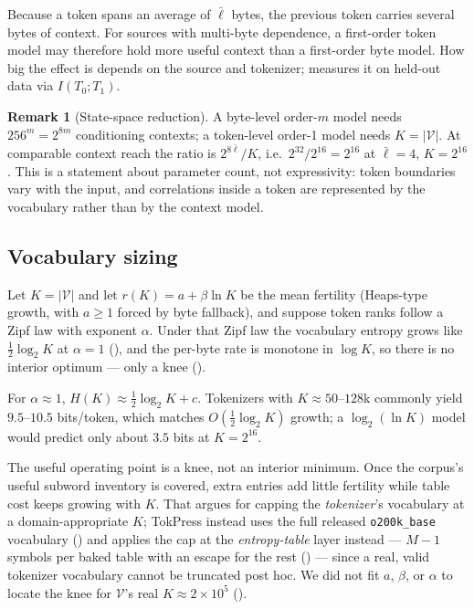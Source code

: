 \documentclass[10pt,twocolumn]{article}
\theoremstyle{plain}
\theoremstyle{definition}
\newtheorem{remark}[theorem]{Remark}
\newcommand{\V}{\mathcal{V}}
\begin{document}
Because a token spans an average of $\bar\ell$ bytes, the previous token carries
several bytes of context. For sources with multi-byte dependence, a first-order token
model may therefore hold more useful context than a first-order byte model. How big
the effect is depends on the source and tokenizer;  measures it on
held-out data via $I(T_0;T_1)$.

\begin{remark}[State-space reduction]\label{rem:states}
A byte-level order-$m$ model needs $256^m = 2^{8m}$ conditioning contexts; a
token-level order-1 model needs $K = |\V|$. At comparable context reach the ratio is
$2^{8\bar\ell}/K$, i.e.\ $2^{32}/2^{16} = 2^{16}$ at $\bar\ell = 4$, $K = 2^{16}$.
This is a statement about parameter count, not expressivity: token boundaries vary
with the input, and correlations inside a token are represented by the vocabulary
rather than by the context model.
\end{remark}

\subsection{Vocabulary sizing}\label{sec:vocab}

Let $K = |\V|$ and let $r(K) = a + \beta \ln K$ be the mean fertility
(Heaps-type growth, with $a \ge 1$ forced by byte fallback), and suppose token
ranks follow a Zipf law with exponent $\alpha$. Under that Zipf law the vocabulary
entropy grows like $\tfrac12\log_2 K$ at $\alpha=1$ (), and the
per-byte rate is monotone in $\log K$, so there is no interior optimum --- only a
knee ().

For $\alpha \approx 1$, $H(K)\approx\tfrac12\log_2 K+c$. Tokenizers with
$K\approx50$--$128$k commonly yield $9.5$--$10.5$ bits/token, which matches
$O(\tfrac12\log_2 K)$ growth; a $\log_2(\ln K)$ model would predict only about $3.5$
bits at $K=2^{16}$.

The useful operating point is a knee, not an interior minimum. Once the corpus's
useful subword inventory is covered, extra entries add little fertility while table
cost keeps growing with $K$. That argues for capping the \emph{tokenizer}'s vocabulary
at a domain-appropriate $K$; TokPress instead uses the full released
\texttt{o200k\_base} vocabulary () and applies the cap at the
\emph{entropy-table} layer instead --- $M{-}1$ symbols per baked table with an escape
for the rest () --- since a real, valid tokenizer vocabulary
cannot be truncated post hoc. We did not fit $a$, $\beta$, or $\alpha$ to locate the
knee for $\V$'s real $K\approx2\times10^5$ ().
\end{document}
